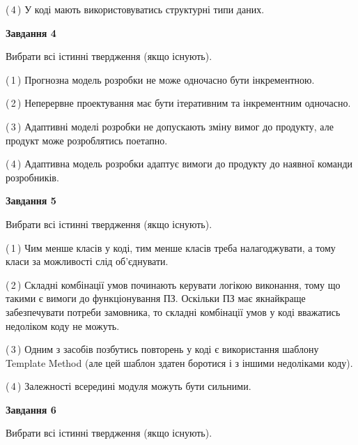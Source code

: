 \documentclass[10pt, ukrainian]{article}
\begin{document}
{\begin {large}
(\,4\,) У коді мають використовуватись структурні типи даних. %


{\begin {center}\textbf{Завдання 4}\end {center}}\par
Вибрати всі істинні твердження (якщо існують).\par
\vspace{2mm}



(\,1\,) Прогнозна модель розробки не може одночасно бути інкрементною. %



(\,2\,) Неперервне проектування має бути ітеративним та інкрементним одночасно. %



(\,3\,) Адаптивні моделі розробки не допускають зміну вимог до продукту, але продукт може розроблятись поетапно. %



(\,4\,) Адаптивна модель розробки адаптує вимоги до продукту до наявної команди розробників. %


{\begin {center}\textbf{Завдання 5}\end {center}}\par
Вибрати всі істинні твердження (якщо існують).\par
\vspace{2mm}



(\,1\,) Чим менше класів у коді, тим менше класів треба налагоджувати, а тому класи за можливості слід об'єднувати. %



(\,2\,) Складні комбінації умов починають керувати логікою виконання, тому що такими є вимоги до функціонування ПЗ. Оскільки ПЗ має якнайкраще забезпечувати потреби замовника, то складні комбінації умов у коді вважатись недоліком коду не можуть. %



(\,3\,) Одним з засобів позбутись повторень у коді є використання шаблону Template Method (але цей шаблон здатен боротися і з іншими недоліками коду). %



(\,4\,) Залежності всередині модуля можуть бути сильними. %

\newpage

{\begin {center}\textbf{Завдання 6}\end {center}}\par
Вибрати всі істинні твердження (якщо існують).\par
\vspace{2mm}




\end{large}}
\end{document}
